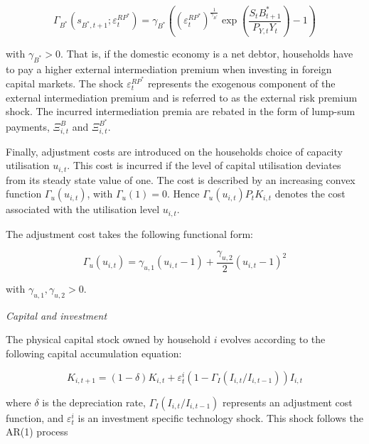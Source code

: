 \documentclass[a4paper,11pt]{article}
\numberwithin{equation}{section}
\begin{document}
	\begin{equation} \label{rp_foreign}
	\Gamma_{B^*}\left(s_{B^*,t+1};\varepsilon^{RP^*}_t\right)=\gamma_{B^*}\left(\left(\varepsilon^{RP^*}_t\right)^{\frac{1}{\gamma_{B^*}}}\exp\left(\frac{S_tB^*_{t+1}}{P_{Y,t}Y_t}\right)-1\right)
	\end{equation}
	
	with $\gamma_{B^*}>0$. That is, if the domestic economy is a net debtor, households have to pay a higher external intermediation premium when investing in foreign capital markets. The shock $\varepsilon^{RP^*}_t$ represents the exogenous component of the external intermediation premium and is referred to as the external risk premium shock. The incurred intermediation premia are rebated in the form of lump-sum payments, $\Xi_{i,t}^B$ and $\Xi_{i,t}^{B^*}$. 
	
	Finally, adjustment costs are introduced on the households choice of capacity utilisation $u_{i,t}$. This cost is incurred if the level of capital utilisation deviates from its steady state value of one. The cost is described by an increasing convex function $\Gamma_u(u_{i,t})$, with $\Gamma_u(1)=0$. Hence $\Gamma_u(u_{i,t})P_tK_{i,t}$ denotes the cost associated with the utilisation level $u_{i,t}$.
	
	The adjustment cost takes the following functional form:
	
	\begin{equation} \label{cap_util_cost}
	\Gamma_u(u_{i,t})=\gamma_{u,1}(u_{i,t}-1)+\frac{\gamma_{u,2}}{2}(u_{i,t}-1)^2
	\end{equation}
	
	with $\gamma_{u,1}, \gamma_{u,2} >0$.
	
	\vspace{8pt}
	\textit{Capital and investment}
	\vspace{8pt}
	
	The physical capital stock owned by household $i$ evolves according to the following capital accumulation equation:
	
	\begin{equation} \label{capital}
	K_{i,t+1}=(1-\delta)K_{i,t}+\varepsilon_t^i\left(1-\Gamma_I\left(I_{i,t}/I_{i,t-1}\right)\right)I_{i,t}
	\end{equation}
	
	where $\delta$ is the depreciation rate, $\Gamma_I\left(I_{i,t}/I_{i,t-1}\right)$ represents an adjustment cost function, and $\varepsilon_t^i$ is an investment specific technology shock. This shock follows the AR(1) process
		
\end{document}
